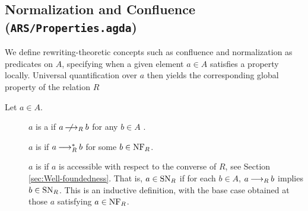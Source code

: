 
\subsection{Normalization and Confluence (\texttt{ARS/Properties.agda})}

We define rewriting-theoretic concepts such as confluence and normalization as predicates on $A$, specifying when a given element $a \in A$ satisfies a property locally. Universal quantification over $a$ then yields the corresponding global property of the relation $R$

\begin{definition} Let $a \in A$.
  \begin{description}
    \item[\bq {}] $a$ is a  if $a \mathbin{\,\,\not \!\!\!\! \mathbin{\longrightarrow_R}} b$ for any $b \in A$ .
    \item[\bq {}] $a$ is  if $a \mathbin{\longrightarrow_R^*} b$ for some $b \in \mathrm{NF}_R$.
    \item[\bq {}] $a$ is  if $a$ is accessible with respect to the converse 
      of $R$, see Section \ref{sec:Well-foundedness}.
      That is, $a \in \mathrm{SN}_R$ if for each $b \in A$, $a \mathbin{\longrightarrow_R} b$ implies $b \in \mathrm{SN}_R$.
        This is an inductive definition, with the base case obtained at
     those $a$ satisfying $a \in \mathrm{NF}_R$.

  \end{description}
\end{definition}

